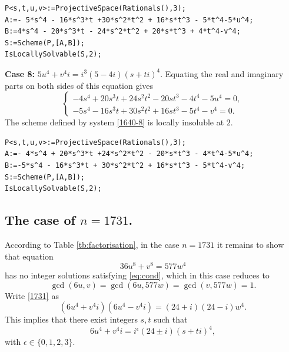 \documentclass[a4paper,12pt,english,reqno]{amsart}
\begin{document}
\begin{lstlisting}
P<s,t,u,v>:=ProjectiveSpace(Rationals(),3);
A:=- 5*s^4 - 16*s^3*t +30*s^2*t^2 + 16*s*t^3 - 5*t^4-5*u^4;
B:=4*s^4 - 20*s^3*t - 24*s^2*t^2 + 20*s*t^3 + 4*t^4-v^4;
S:=Scheme(P,[A,B]);
IsLocallySolvable(S,2);
\end{lstlisting}

{\bf Case 8:} $5u^4+v^4i=i^3(5-4i)(s+ti)^4$. Equating the real and imaginary parts on both sides of this equation gives
\begin{equation}\label{1640-8}
\begin{cases}
-4s^4 + 20s^3t + 24s^2t^2 - 20st^3 - 4t^4 - 5u^4=0,\\
-5s^4 - 16s^3t + 30s^2t^2 + 16st^3 - 5t^4 - v^4=0.
\end{cases}
\end{equation}
The scheme defined by system \eqref{1640-8} is locally insoluble at $2$.


\begin{lstlisting}
P<s,t,u,v>:=ProjectiveSpace(Rationals(),3);
A:=- 4*s^4 + 20*s^3*t +24*s^2*t^2 - 20*s*t^3 - 4*t^4-5*u^4;
B:=-5*s^4 - 16*s^3*t + 30*s^2*t^2 + 16*s*t^3 - 5*t^4-v^4;
S:=Scheme(P,[A,B]);
IsLocallySolvable(S,2);
\end{lstlisting}

\subsection{The case of $n=1731$.}%

According to Table \ref{tb:factorisation}, in the case $n=1731$ it remains to
show that equation
\begin{equation}\label{1731}
36 u^8 + v^8=577  w^4
\end{equation}
has no integer solutions satisfying \eqref{eq:cond}, which in this case reduces to \[\gcd(6u,v)=\gcd(6u,577w)=\gcd(v,577w)=1.\]   Write \eqref{1731} as
\begin{equation} (6u^4+v^4i)(6u^4-v^4i)=(24+i)(24-i)w^4.
\end{equation}
This implies that there exist integers $s,t$ such that 
\[6u^4+v^4i=i^{\epsilon}(24\pm i)(s+ti)^4,\]
with $\epsilon \in \{0,1,2,3\}$.
\end{document}
